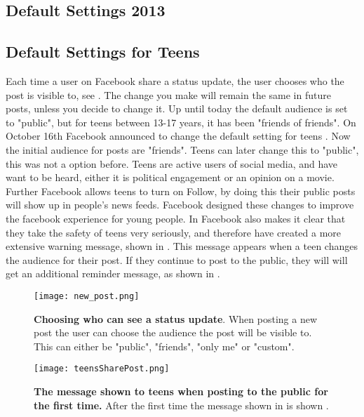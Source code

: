 \subsection{Default Settings 2013}


\subsection{Default Settings for Teens}
Each time a user on Facebook share a status update, the user chooses who the post is visible to, see . The change you make will remain the same in future posts, unless you decide to change it. Up until today the default audience is set to "public", but for teens between 13-17 years, it has been "friends of friends". On October 16th Facebook announced to change the default setting for teens \cite{defaultTeens}. Now the initial audience for posts are "friends". Teens can later change this to "public", this was not a option before. Teens are active users of social media, and have want to be heard, either it is political engagement or an opinion on a movie. Further Facebook allows teens to turn on Follow, by doing this their public posts will show up in people's news feeds. Facebook designed these changes to improve the facebook experience for young people. In \cite{defaultTeens} Facebook also makes it clear that they take the safety of teens very seriously, and therefore have created a more extensive warning message, shown in  . This message appears when a teen changes the audience for their post. If they continue to post to the public, they will will get an additional reminder message, as shown in  .

\begin{figure}[h!]
\centering
\texttt{[image: new\_post.png]}
\caption[Choosing who can see a status update.]{\textbf{Choosing who can see a status update}. When posting a new post the user can choose the audience the post will be visible to. This can either be "public", "friends", "only me" or "custom".} 
\label{fig:newPost}
\end{figure}

\begin{figure}[h!]
\centering
\texttt{[image: teensSharePost.png]}
\caption[The message shown to teens when posting to the public for the first time]{\textbf{The message shown to teens when posting to the public for the first time.} After the first time the message shown in  is shown \cite{defaultTeens}.} 
\label{fig:teensSharePost}
\end{figure}

